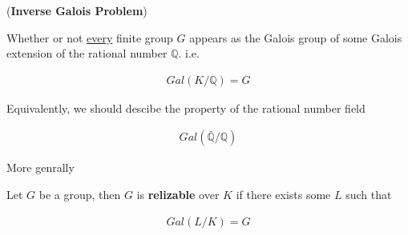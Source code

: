 \documentclass[Total.tex]{subfiles}
\begin{document}
	\begin{OP}
		(\textbf{Inverse Galois Problem})
		
		Whether or not \underline{every} finite group $G$ appears as the Galois group of some Galois extension of the rational number $\mathbb{Q}$. i.e.
		
		\begin{gather*}
			Gal(K/\mathbb{Q})=G
		\end{gather*}
	\end{OP}
	
	
	Equivalently, we should descibe the property of the rational number field
	
	\begin{gather*}
		Gal(\bar{\mathbb{Q}}/\mathbb{Q})
	\end{gather*}
	
	More genrally
	
	\begin{Def}
		Let $G$ be a group, then $G$ is \textbf{relizable} over $K$ if there exists some $L$ such that
		
		\begin{gather*}
			Gal(L/K)=G
		\end{gather*}
	\end{Def}
	
\end{document}
